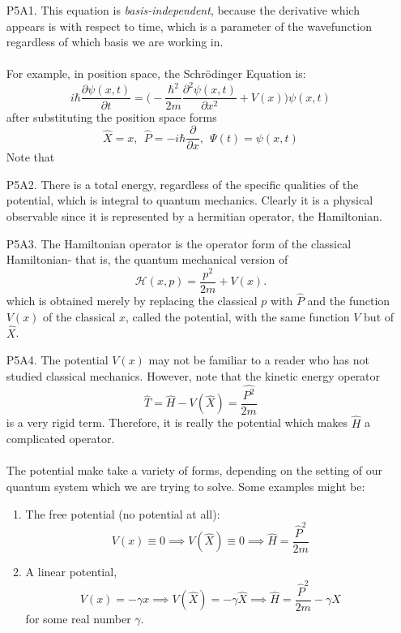 \begin{enumerate}
    \item [P5A1.] This equation is \textit{basis-independent}, because the derivative which appears is with respect to time, which is a parameter of the wavefunction regardless of which basis we are working in.
    \\\\
    For example, in position space, the Schr\"{o}dinger Equation is:
    $$
    i\hbar\frac{\partial \psi(x,t)}{\partial t}= \biggl(-\frac{\hbar^2}{2m}\frac{\partial^2 \psi(x,t)}{\partial x^2}+ V(x)\biggr)\psi(x,t)
    $$
    after substituting the position space forms
    $$
    \hat{X}=x, \:\: \hat{P}=-i\hbar\frac{\partial}{\partial x}, \:\: \Psi(t) = \psi(x,t)
    $$
    Note that 
    \item[P5A2.] There is a total energy, regardless of the specific qualities of the potential, which is integral to quantum mechanics. Clearly it is a physical observable since it is represented by a hermitian operator, the Hamiltonian.
    \item[P5A3.] The Hamiltonian operator is the operator form of the classical Hamiltonian- that is, the quantum mechanical version of 
    $$
    \mathscr{H}(x,p)=\frac{p^2}{2m}+V(x).
    $$
    which is obtained merely by replacing the classical $p$ with $\hat{P}$ and the function $V(x)$ of the classical $x$, called the potential, with the same function $V$ but of $\hat{X}$.
    \item[P5A4.] The potential $V(x)$ may not be familiar to a reader who has not studied classical mechanics. However, note that the kinetic energy operator $$\hat{T}= \hat{H}-V(\hat{X})= \frac{\hat{P^2}}{2m}$$ is a very rigid term. Therefore, it is really the potential which makes $\hat{H}$ a complicated operator.
    \\\\
    The potential make take a variety of forms, depending on the setting of our quantum system which we are trying to solve. Some examples might be:
    \begin{enumerate}
        \item The free potential (no potential at all):
        $$
        V(x)\equiv 0 \implies V(\hat{X}) \equiv 0 \implies \hat{H} = \frac{\hat{P}^{2}}{2m}
        $$
        \item A linear potential, 
        $$
        V(x)= -\gamma x\implies V(\hat{X}) = -\gamma\hat{X}\implies \hat{H} = \frac{\hat{P}^{2}}{2m}-\gamma\hat{X}
        $$
        for some real number $\gamma$.

\end{enumerate}
\end{enumerate}
